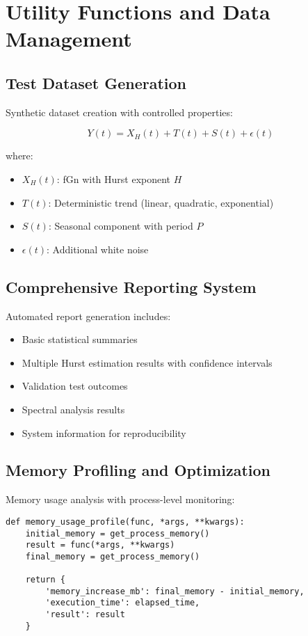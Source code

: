 \documentclass[11pt,a4paper]{article}
\begin{document}
\section{Utility Functions and Data Management}

\subsection{Test Dataset Generation}

Synthetic dataset creation with controlled properties:

\begin{equation}
Y(t) = X_H(t) + T(t) + S(t) + \epsilon(t)
\end{equation}

where:
\begin{itemize}
    \item $X_H(t)$: fGn with Hurst exponent $H$
    \item $T(t)$: Deterministic trend (linear, quadratic, exponential)
    \item $S(t)$: Seasonal component with period $P$
    \item $\epsilon(t)$: Additional white noise
\end{itemize}

\subsection{Comprehensive Reporting System}

Automated report generation includes:
\begin{itemize}
    \item Basic statistical summaries
    \item Multiple Hurst estimation results with confidence intervals
    \item Validation test outcomes
    \item Spectral analysis results
    \item System information for reproducibility
\end{itemize}

\subsection{Memory Profiling and Optimization}

Memory usage analysis with process-level monitoring:

\begin{lstlisting}
def memory_usage_profile(func, *args, **kwargs):
    initial_memory = get_process_memory()
    result = func(*args, **kwargs)
    final_memory = get_process_memory()
    
    return {
        'memory_increase_mb': final_memory - initial_memory,
        'execution_time': elapsed_time,
        'result': result
    }
\end{lstlisting}
\end{document}

